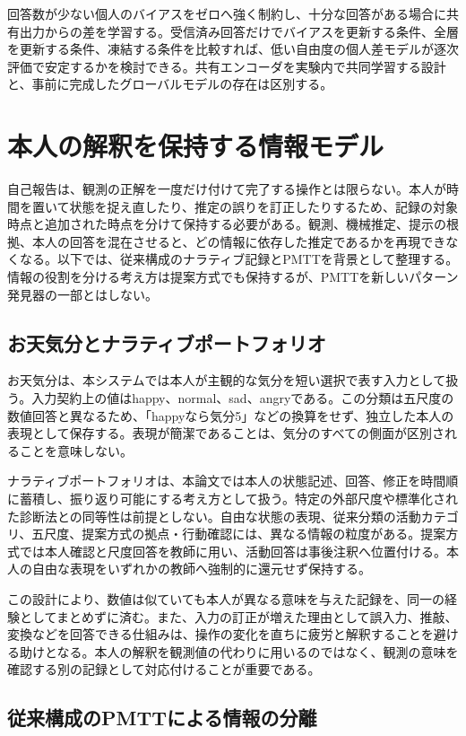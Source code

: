 回答数が少ない個人のバイアスをゼロへ強く制約し、十分な回答がある場合に共有出力からの差を学習する。受信済み回答だけでバイアスを更新する条件、全層を更新する条件、凍結する条件を比較すれば、低い自由度の個人差モデルが逐次評価で安定するかを検討できる。共有エンコーダを実験内で共同学習する設計と、事前に完成したグローバルモデルの存在は区別する。

\section{本人の解釈を保持する情報モデル}

自己報告は、観測の正解を一度だけ付けて完了する操作とは限らない。本人が時間を置いて状態を捉え直したり、推定の誤りを訂正したりするため、記録の対象時点と追加された時点を分けて保持する必要がある。観測、機械推定、提示の根拠、本人の回答を混在させると、どの情報に依存した推定であるかを再現できなくなる。以下では、従来構成のナラティブ記録とPMTTを背景として整理する。情報の役割を分ける考え方は提案方式でも保持するが、PMTTを新しいパターン発見器の一部とはしない。

\subsection{お天気分とナラティブポートフォリオ}

お天気分は、本システムでは本人が主観的な気分を短い選択で表す入力として扱う。入力契約上の値はhappy、normal、sad、angryである。この分類は五尺度の数値回答と異なるため、「happyなら気分5」などの換算をせず、独立した本人の表現として保存する。表現が簡潔であることは、気分のすべての側面が区別されることを意味しない。

ナラティブポートフォリオは、本論文では本人の状態記述、回答、修正を時間順に蓄積し、振り返り可能にする考え方として扱う。特定の外部尺度や標準化された診断法との同等性は前提としない。自由な状態の表現、従来分類の活動カテゴリ、五尺度、提案方式の拠点・行動確認には、異なる情報の粒度がある。提案方式では本人確認と尺度回答を教師に用い、活動回答は事後注釈へ位置付ける。本人の自由な表現をいずれかの教師へ強制的に還元せず保持する。

この設計により、数値は似ていても本人が異なる意味を与えた記録を、同一の経験としてまとめずに済む。また、入力の訂正が増えた理由として誤入力、推敲、変換などを回答できる仕組みは、操作の変化を直ちに疲労と解釈することを避ける助けとなる。本人の解釈を観測値の代わりに用いるのではなく、観測の意味を確認する別の記録として対応付けることが重要である。

\subsection{従来構成のPMTTによる情報の分離}

